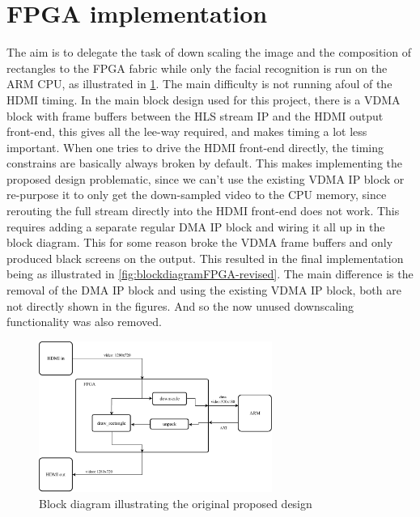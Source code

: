 \documentclass[conference]{IEEEtran}
\begin{document}
\section{FPGA implementation}
The aim is to delegate the task of down scaling the image and the composition of rectangles to the FPGA fabric while only the facial recognition is run on the ARM CPU, as illustrated in \cref{fig:blockdiagramFPGA-original}.
The main difficulty is not running afoul of the HDMI timing. In the main block design used for this project, there is a VDMA block with frame buffers between the HLS stream IP and the HDMI output front-end, this gives all the lee-way required, and makes timing a lot less important. When one tries to drive the HDMI front-end directly, the timing constrains are basically always broken by default. This makes implementing the proposed design problematic, since we can't use the existing VDMA IP block or re-purpose it to only get the down-sampled video to the CPU memory, since rerouting the full stream directly into the HDMI front-end does not work. This requires adding a separate regular DMA IP block and wiring it all up in the block diagram. This for some reason broke the VDMA frame buffers and only produced black screens on the output. This resulted in the final implementation being as illustrated in \cref{fig:blockdiagramFPGA-revised}. The main difference is the removal of the DMA IP block and using the existing VDMA IP block, both are not directly shown in the figures. And so the now unused downscaling functionality was also removed.

\begin{figure}[h!]
    \centering
    \includegraphics[width=0.68\textwidth]{resources/BlockDiagram-Original.pdf}
    \caption{Block diagram illustrating the original proposed design}
    \label{fig:blockdiagramFPGA-original}
\end{figure}
\end{document}

